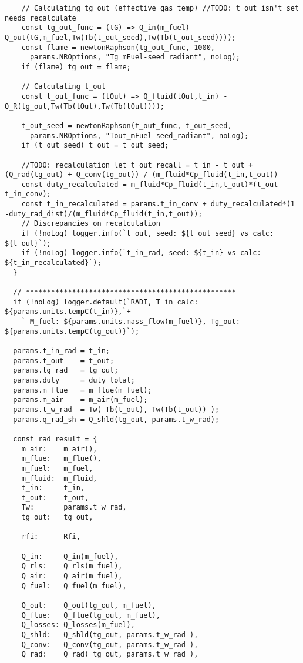 \begin{verbatim}
    // Calculating tg_out (effective gas temp) //TODO: t_out isn't set needs recalculate
    const tg_out_func = (tG) => Q_in(m_fuel) -Q_out(tG,m_fuel,Tw(Tb(t_out_seed),Tw(Tb(t_out_seed))));
    const flame = newtonRaphson(tg_out_func, 1000, 
      params.NROptions, "Tg_mFuel-seed_radiant", noLog);
    if (flame) tg_out = flame;

    // Calculating t_out 
    const t_out_func = (tOut) => Q_fluid(tOut,t_in) -Q_R(tg_out,Tw(Tb(tOut),Tw(Tb(tOut))));

    t_out_seed = newtonRaphson(t_out_func, t_out_seed, 
      params.NROptions, "Tout_mFuel-seed_radiant", noLog);
    if (t_out_seed) t_out = t_out_seed;

    //TODO: recalculation let t_out_recall = t_in - t_out + (Q_rad(tg_out) + Q_conv(tg_out)) / (m_fluid*Cp_fluid(t_in,t_out))
    const duty_recalculated = m_fluid*Cp_fluid(t_in,t_out)*(t_out -t_in_conv);
    const t_in_recalculated = params.t_in_conv + duty_recalculated*(1 -duty_rad_dist)/(m_fluid*Cp_fluid(t_in,t_out));  
    // Discrepancies on recalculation
    if (!noLog) logger.info(`t_out, seed: ${t_out_seed} vs calc: ${t_out}`);
    if (!noLog) logger.info(`t_in_rad, seed: ${t_in} vs calc: ${t_in_recalculated}`);
  }

  // **************************************************
  if (!noLog) logger.default(`RADI, T_in_calc: ${params.units.tempC(t_in)},`+
    ` M_fuel: ${params.units.mass_flow(m_fuel)}, Tg_out: ${params.units.tempC(tg_out)}`);

  params.t_in_rad = t_in;
  params.t_out    = t_out;
  params.tg_rad   = tg_out;
  params.duty     = duty_total;
  params.m_flue   = m_flue(m_fuel);
  params.m_air    = m_air(m_fuel);
  params.t_w_rad  = Tw( Tb(t_out), Tw(Tb(t_out)) );
  params.q_rad_sh = Q_shld(tg_out, params.t_w_rad);

  const rad_result = {
    m_air:    m_air(),
    m_flue:   m_flue(),
    m_fuel:   m_fuel,
    m_fluid:  m_fluid,
    t_in:     t_in,
    t_out:    t_out,
    Tw:       params.t_w_rad,
    tg_out:   tg_out,

    rfi:      Rfi,

    Q_in:     Q_in(m_fuel),
    Q_rls:    Q_rls(m_fuel),
    Q_air:    Q_air(m_fuel),
    Q_fuel:   Q_fuel(m_fuel),
    
    Q_out:    Q_out(tg_out, m_fuel),
    Q_flue:   Q_flue(tg_out, m_fuel),
    Q_losses: Q_losses(m_fuel),
    Q_shld:   Q_shld(tg_out, params.t_w_rad ),
    Q_conv:   Q_conv(tg_out, params.t_w_rad ),
    Q_rad:    Q_rad( tg_out, params.t_w_rad ),


\end{verbatim}
